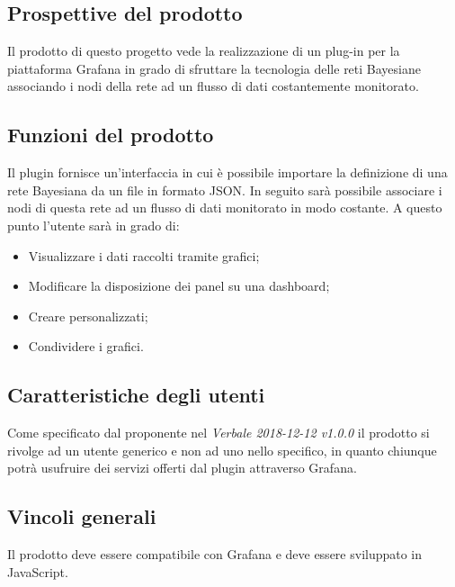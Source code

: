 
\subsection{Prospettive del prodotto}
Il prodotto di questo progetto vede la realizzazione di un plug-in per la piattaforma Grafana in grado di sfruttare la tecnologia delle reti Bayesiane associando i nodi della rete ad un flusso di dati costantemente monitorato.

\subsection{Funzioni del prodotto}
Il plugin fornisce un'interfaccia in cui è possibile importare la definizione di una rete Bayesiana da un file in formato JSON. In seguito sarà possibile associare i nodi di questa rete ad un flusso di dati monitorato in modo costante. A questo punto l'utente sarà in grado di:
\begin{itemize}
	\item Visualizzare i dati raccolti tramite grafici;
	\item Modificare la disposizione dei panel su una dashboard;
	\item Creare  personalizzati;
	\item Condividere i grafici.
\end{itemize}

\subsection{Caratteristiche degli utenti}
Come specificato dal proponente nel \emph{Verbale 2018-12-12 v1.0.0} il prodotto si rivolge ad un utente generico e non ad uno nello specifico, in quanto chiunque potrà usufruire dei servizi offerti dal plugin attraverso Grafana. 

\subsection{Vincoli generali}
Il prodotto deve essere compatibile con Grafana e deve essere sviluppato in JavaScript.

\pagebreak